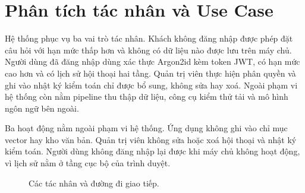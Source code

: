 \section{Phân tích tác nhân và Use Case}
\label{sec:phan-tich-tac-nhan}

Hệ thống phục vụ ba vai trò tác nhân. Khách không đăng nhập được phép đặt câu hỏi với hạn mức thấp hơn và không có dữ liệu nào được lưu trên máy chủ. Người dùng đã đăng nhập dùng xác thực Argon2id kèm token JWT, có hạn mức cao hơn và có lịch sử hội thoại hai tầng. Quản trị viên thực hiện phân quyền và ghi vào nhật ký kiểm toán chỉ được bổ sung, không sửa hay xoá. Ngoài phạm vi hệ thống còn nằm pipeline thu thập dữ liệu, công cụ kiểm thử tải và mô hình ngôn ngữ bên ngoài.

Ba hoạt động nằm ngoài phạm vi hệ thống. Ứng dụng không ghi vào chỉ mục vector hay kho văn bản. Quản trị viên không sửa hoặc xoá hội thoại và nhật ký kiểm toán. Người dùng không đăng nhập lại được khi máy chủ không hoạt động, vì lịch sử nằm ở tầng cục bộ của trình duyệt.

\begin{figure}[htbp]
    \centering
    \caption{Các tác nhân và đường đi giao tiếp.}
    \label{fig:tac-nhan-giao-tiep}
\end{figure}

